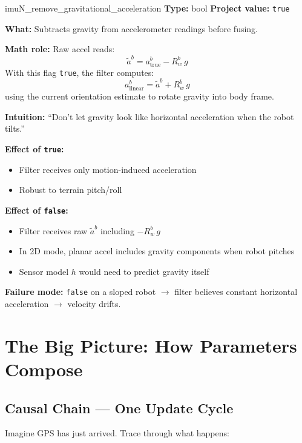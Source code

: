 \documentclass[11pt,a4paper]{article}
\begin{document}
\begin{paramcard}{imuN\_remove\_gravitational\_acceleration}
\textbf{Type:} bool \quad \textbf{Project value:} \texttt{true}

\textbf{What:} Subtracts gravity from accelerometer readings before fusing.

\textbf{Math role:} Raw accel reads:
\[
\tilde{a}^b = a^b_{\text{true}} - R^b_w\, g
\]
With this flag \texttt{true}, the filter computes:
\[
a^b_{\text{linear}} = \tilde{a}^b + R^b_w\, g
\]
using the current orientation estimate to rotate gravity into body frame.

\textbf{Intuition:} ``Don't let gravity look like horizontal acceleration when the robot tilts.''

\textbf{Effect of \texttt{true}:}
\begin{itemize}
\item Filter receives only motion-induced acceleration
\item Robust to terrain pitch/roll
\end{itemize}

\textbf{Effect of \texttt{false}:}
\begin{itemize}
\item Filter receives raw $\tilde{a}^b$ including $-R^b_w\, g$
\item In 2D mode, planar accel includes gravity components when robot pitches
\item Sensor model $h$ would need to predict gravity itself
\end{itemize}

\textbf{Failure mode:} \texttt{false} on a sloped robot $\to$ filter believes constant horizontal acceleration $\to$ velocity drifts.
\end{paramcard}

\section{The Big Picture: How Parameters Compose}

\subsection{Causal Chain --- One Update Cycle}

Imagine GPS has just arrived. Trace through what happens:
\end{document}
